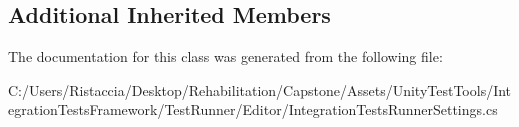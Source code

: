\subsection*{Additional Inherited Members}


The documentation for this class was generated from the following file\+:\begin{DoxyCompactItemize}
\item 
C\+:/\+Users/\+Ristaccia/\+Desktop/\+Rehabilitation/\+Capstone/\+Assets/\+Unity\+Test\+Tools/\+Integration\+Tests\+Framework/\+Test\+Runner/\+Editor/Integration\+Tests\+Runner\+Settings.\+cs\end{DoxyCompactItemize}
